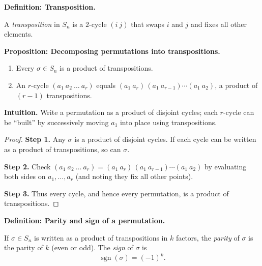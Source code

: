 \documentclass[9pt]{article}
\theoremstyle{definition}
\begin{document}
\newpage

\noindent\textbf{Definition: Transposition.}

\newpage

A \emph{transposition} in $S_n$ is a $2$-cycle $(i\ j)$ that swaps $i$ and $j$ and fixes all other elements.

\newpage


\noindent\textbf{Proposition: Decomposing permutations into transpositions.}

\newpage

\begin{enumerate}
  \item Every $\sigma\in S_n$ is a product of transpositions.
  \item An $r$-cycle $(a_1\ a_2\ \dots\ a_r)$ equals $(a_1\ a_r)\,(a_1\ a_{r-1})\cdots(a_1\ a_2)$, a product of $(r-1)$ transpositions.
\end{enumerate}

\dotfill

\noindent\textbf{Intuition.}
Write a permutation as a product of disjoint cycles; each $r$-cycle can be “built” by successively moving $a_1$ into place using transpositions.

\dotfill

\begin{proof}
\textbf{Step 1.} Any $\sigma$ is a product of disjoint cycles. If each cycle can be written as a product of transpositions, so can $\sigma$.

\textbf{Step 2.} Check $(a_1\ a_2\ \dots\ a_r)=(a_1\ a_r)\,(a_1\ a_{r-1})\cdots(a_1\ a_2)$ by evaluating both sides on $a_1,\dots,a_r$ (and noting they fix all other points).

\textbf{Step 3.} Thus every cycle, and hence every permutation, is a product of transpositions.
\end{proof}

\newpage


\noindent\textbf{Definition: Parity and sign of a permutation.}

\newpage

If $\sigma\in S_n$ is written as a product of transpositions in $k$ factors, the \emph{parity} of $\sigma$ is the parity of $k$ (even or odd). The \emph{sign} of $\sigma$ is
\[
\operatorname{sgn}(\sigma)=(-1)^k.
\]
\end{document}
